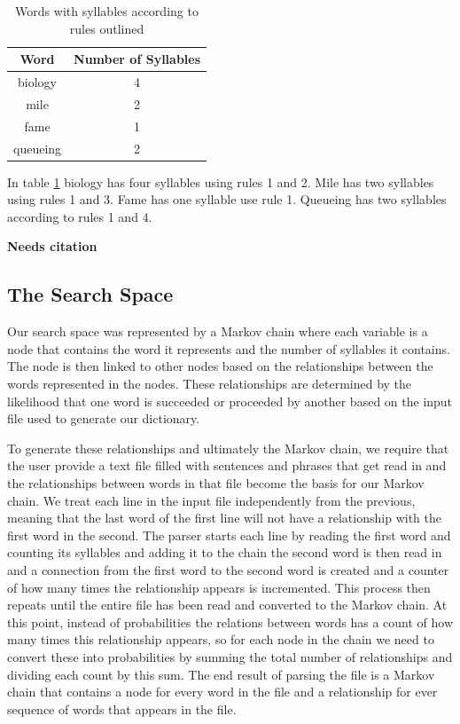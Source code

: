 \documentclass[]{article}
\newcommand{\comment}[1]
{\par {\bfseries \color{green} #1 \par}}
\begin{document}
\begin{table}[H]
\begin{center}
	\begin{tabular}{| c | c |}
		\hline
		Word & Number of Syllables \\
		\hline
		biology & 4 \\
		\hline
		mile & 2 \\
		\hline
		fame & 1 \\
		\hline
		queueing & 2 \\
		\hline
	\end{tabular}
\caption{Words with syllables according to rules outlined}
\label{table:syllables}
\end{center}
\end{table}

In table \ref{table:syllables} biology has four syllables using rules 1 and 2. Mile has two syllables using rules 1 and 3. Fame has one syllable use rule 1. Queueing has two syllables according to rules 1 and 4. \comment{Needs citation}
\subsection{The Search Space}
Our search space was represented by a Markov chain where each variable is a node that contains the word it represents and the number of syllables it contains. The node is then linked to other nodes based on the relationships between the words represented in the nodes. These relationships are determined by the likelihood that one word is succeeded or proceeded by another based on the input file used to generate our dictionary.

To generate these relationships and ultimately the Markov chain, we require that the user provide a text file filled with sentences and phrases that get read in and the relationships between words in that file become the basis for our Markov chain. We treat each line in the input file independently from the previous, meaning that the last word of the first line will not have a relationship with the first word in the second. The parser starts each line by reading the first word and counting its syllables and adding it to the chain the second word is then read in and a connection from the first word to the second word is created and a counter of how many times the relationship appears is incremented. This process then repeats until the entire file has been read and converted to the Markov chain. At this point, instead of probabilities the relations between words has a count of how many times this relationship appears, so for each node in the chain we need to convert these into probabilities by summing the total number of relationships and dividing each count by this sum. The end result of parsing the file is a Markov chain that contains a node for every word in the file and a relationship for ever sequence of words that appears in the file.
\end{document}
